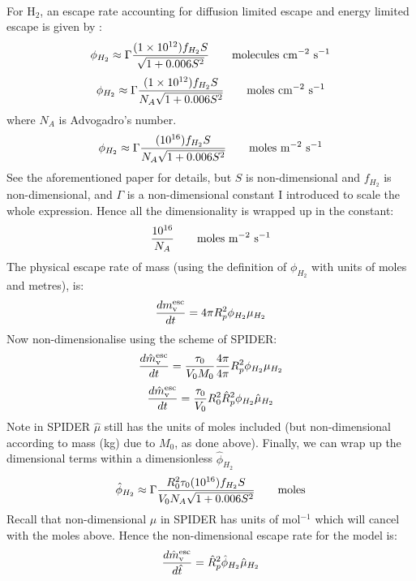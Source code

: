 ~\\ \textbf{\cite{ZGC19}}\\~\\
For H$_2$, an escape rate accounting for diffusion limited escape and energy limited escape is given by \citep[Eq. 3,][]{ZGC19}:
\begin{equation}
\phi_{H_2} \approx \Gamma \frac{(1 \times 10^{12}) f_{H_2} S}{\sqrt{1+0.006S^2}} \qquad \rm{molecules}\ {\rm cm}^{-2}\ {\rm s}^{-1}
\end{equation}
\begin{equation}
\phi_{H_2} \approx \Gamma \frac{(1 \times 10^{12}) f_{H_2} S}{N_A \sqrt{1+0.006S^2}} \qquad \rm{moles}\ {\rm cm}^{-2}\ {\rm s}^{-1}
\end{equation}
where $N_A$ is Advogadro's number.
\begin{equation}
\phi_{H_2} \approx \Gamma \frac{(10^{16}) f_{H_2} S}{N_A \sqrt{1+0.006S^2}} \qquad \rm{moles}\ {\rm m}^{-2}\ {\rm s}^{-1}
\end{equation}
See the aforementioned paper for details, but $S$ is non-dimensional and $f_{H_2}$ is non-dimensional, and $\Gamma$ is a non-dimensional constant I introduced to scale the whole expression.  Hence all the dimensionality is wrapped up in the constant:
\begin{equation}
\frac{10^{16}}{N_A} \qquad \rm{moles}\ {\rm m}^{-2}\ {\rm s}^{-1}
\end{equation}
The physical escape rate of mass (using the definition of $\phi_{H_2}$ with units of moles and metres), is:
\begin{equation}
\frac{dm_{\rm v}^{\rm esc}}{dt} = 4\pi R_p^2 \phi_{H_2} \mu_{H_2}
\end{equation}
Now non-dimensionalise using the scheme of SPIDER:
\begin{equation}
\frac{d\hat{m}_{\rm v}^{\rm esc}}{dt} = \frac{\tau_0}{V_0 M_0} \frac{4\pi}{4\pi} R_p^2 \phi_{H_2} \mu_{H_2}
\end{equation}
\begin{equation}
\frac{d\hat{m}_{\rm v}^{\rm esc}}{dt} = \frac{\tau_0}{V_0} R_0^2 \hat{R}_p^2 \phi_{H_2} \hat{\mu}_{H_2}
\end{equation}
Note in SPIDER $\hat{\mu}$ still has the units of moles included (but non-dimensional according to mass (kg) due to $M_0$, as done above).  Finally, we can wrap up the dimensional terms within a dimensionless $\hat{\phi}_{H_2}$
\begin{equation}
\hat{\phi}_{H_2} \approx \Gamma \frac{R_0^2 \tau_0 (10^{16}) f_{H_2} S}{V_0 N_A \sqrt{1+0.006S^2}} \qquad \rm{moles}
\end{equation}
Recall that non-dimensional $\mu$ in SPIDER has units of mol$^{-1}$ which will cancel with the moles above.  Hence the non-dimensional escape rate for the \cite{ZGC19} model is:
\begin{equation}
\frac{d\hat{m}_{\rm v}^{\rm esc}}{d\hat{t}} = \hat{R}_p^2 \hat{\phi}_{H_2} \hat{\mu}_{H_2}
\end{equation}
